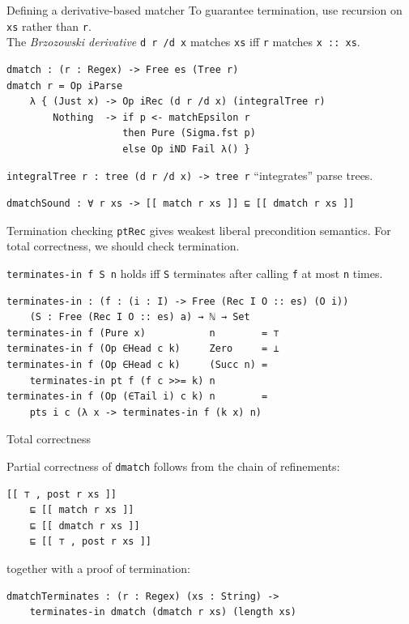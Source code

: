 \documentclass[ignorenonframetext,]{beamer}
\newcommand{\Agda}[1]{\texttt{#1}\xspace}
\begin{document}
\begin{frame}[fragile]{Defining a derivative-based matcher}
To guarantee termination, use recursion on \Agda{xs} rather than \Agda{r}.\\
The \emph{Brzozowski derivative} \Agda{d r /d x} matches \Agda{xs} iff \Agda{r} matches \Agda{x :: xs}.

\begin{verbatim}
dmatch : (r : Regex) -> Free es (Tree r)
dmatch r = Op iParse
    λ { (Just x) -> Op iRec (d r /d x) (integralTree r)
        Nothing  -> if p <- matchEpsilon r
                    then Pure (Sigma.fst p)
                    else Op iND Fail λ() }
\end{verbatim}

\Agda{integralTree r : tree (d r /d x) -> tree r} ``integrates'' parse trees.

\pause

\begin{verbatim}
dmatchSound : ∀ r xs -> [[ match r xs ]] ⊑ [[ dmatch r xs ]]
\end{verbatim}
\end{frame}

\begin{frame}[fragile]{Termination checking}
\Agda{ptRec} gives weakest liberal precondition semantics.
For total correctness, we should check termination.

\Agda{terminates-in f S n} holds iff \Agda{S} terminates after calling \Agda{f} at most \Agda{n} times.

\begin{verbatim}
terminates-in : (f : (i : I) -> Free (Rec I O :: es) (O i))
    (S : Free (Rec I O :: es) a) → ℕ → Set
terminates-in f (Pure x)           n        = ⊤
terminates-in f (Op ∈Head c k)     Zero     = ⊥
terminates-in f (Op ∈Head c k)     (Succ n) =
    terminates-in pt f (f c >>= k) n
terminates-in f (Op (∈Tail i) c k) n        =
    pts i c (λ x -> terminates-in f (k x) n)
\end{verbatim}
\end{frame}

\begin{frame}[fragile]{Total correctness}

Partial correctness of \Agda{dmatch} follows from the chain of refinements:
\begin{verbatim}
[[ ⊤ , post r xs ]]
    ⊑ [[ match r xs ]]
    ⊑ [[ dmatch r xs ]]
    ⊑ [[ ⊤ , post r xs ]]
\end{verbatim}
together with a proof of termination:
\begin{verbatim}
dmatchTerminates : (r : Regex) (xs : String) ->
    terminates-in dmatch (dmatch r xs) (length xs)
\end{verbatim}

\end{frame}
\end{document}
